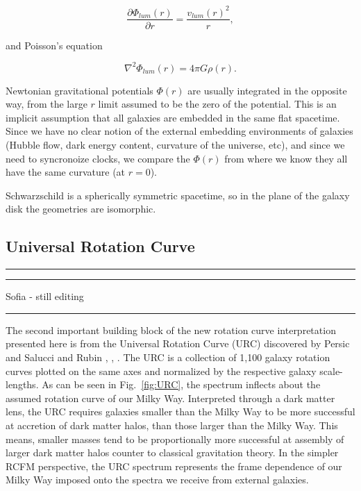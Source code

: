 \documentclass[reprint,%
 amsmath,amssymb,
 aps,
]{revtex4-1}
\begin{document}
\begin{equation}
 \frac{\partial \Phi_{lum}(r)}{\partial r}    =\frac{v_{lum}(r)^2}{r},  
    \label{zoochance1}
\end{equation}

 and Poisson's equation
 
\begin{equation}
\nabla^2 \Phi_{lum} (r) = 4\pi G \rho (r).   
    \label{whatsgood}
\end{equation}

 
 
   Newtonian gravitational potentials $\Phi(r)$  are usually integrated in the opposite way, from the large $r$ limit assumed to be the zero of the 
     potential. This is  an implicit assumption that all galaxies are embedded in the same flat spacetime. Since we have no clear notion of the external embedding environments of galaxies (Hubble flow, dark energy content, curvature of the universe, etc), and since we need to syncronoize clocks,  we compare the 
   $\Phi(r)$ from where we know they all have the same curvature (at $r=0$).
   
    
 
Schwarzschild is a spherically symmetric spacetime, so in the plane of the galaxy disk the geometries are isomorphic. 

 \subsection{Universal Rotation Curve }

 {\color{teal} \rule{\linewidth}{0.5mm}}
 
{\color{teal} \rule{\linewidth}{0.5mm}}
 
 {\color{teal}Sofia - still editing}
 {\color{teal} \rule{\linewidth}{0.5mm}}
 
 The second important building block of the new rotation curve interpretation  presented here   is from      the Universal Rotation Curve (URC) discovered by   Persic and Salucci and Rubin \cite{salucci}, \cite{Persic},  \cite{1978Rubin}.  The URC is  a collection of  1,100 galaxy rotation curves   plotted on the same   axes  and normalized by the  respective galaxy scale-lengths.  As can be seen   in Fig.~\ref{fig:URC},    
 the spectrum   inflects about   the assumed rotation curve of our   Milky Way.  Interpreted through a dark matter lens, the URC requires  
   galaxies smaller than the Milky Way to be more successful at accretion of    dark matter halos, than those    larger than the Milky Way.
   This means,  smaller masses tend to be   proportionally more successful at assembly of  larger dark matter halos counter to    classical gravitation theory.    In the simpler RCFM perspective,  the URC spectrum    represents the frame dependence of our Milky Way imposed onto the spectra  we receive  from external galaxies.  
 
\end{document}

